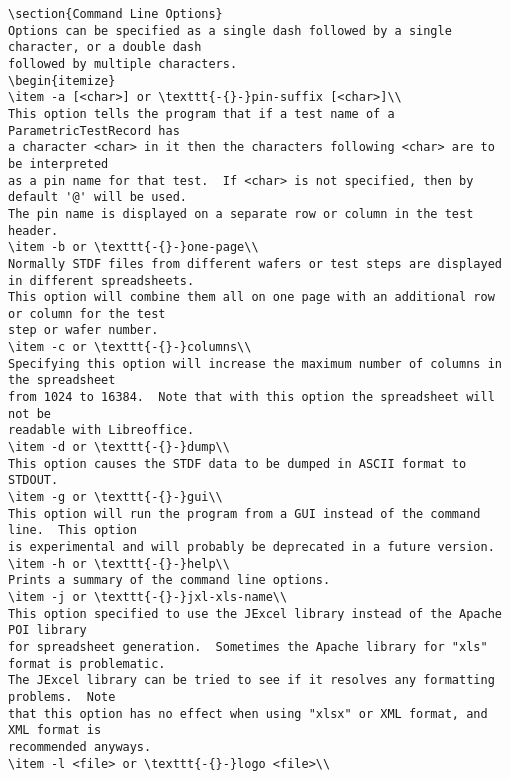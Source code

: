 \documentclass[letterpaper]{article}
\begin{document}
\begin{verbatim}
\section{Command Line Options}
Options can be specified as a single dash followed by a single character, or a double dash
followed by multiple characters.
\begin{itemize}
\item -a [<char>] or \texttt{-{}-}pin-suffix [<char>]\\
This option tells the program that if a test name of a ParametricTestRecord has
a character <char> in it then the characters following <char> are to be interpreted
as a pin name for that test.  If <char> is not specified, then by default '@' will be used.
The pin name is displayed on a separate row or column in the test header.
\item -b or \texttt{-{}-}one-page\\
Normally STDF files from different wafers or test steps are displayed in different spreadsheets.
This option will combine them all on one page with an additional row or column for the test
step or wafer number.
\item -c or \texttt{-{}-}columns\\
Specifying this option will increase the maximum number of columns in the spreadsheet
from 1024 to 16384.  Note that with this option the spreadsheet will not be
readable with Libreoffice.
\item -d or \texttt{-{}-}dump\\
This option causes the STDF data to be dumped in ASCII format to STDOUT.
\item -g or \texttt{-{}-}gui\\
This option will run the program from a GUI instead of the command line.  This option
is experimental and will probably be deprecated in a future version.
\item -h or \texttt{-{}-}help\\
Prints a summary of the command line options.
\item -j or \texttt{-{}-}jxl-xls-name\\
This option specified to use the JExcel library instead of the Apache POI library
for spreadsheet generation.  Sometimes the Apache library for "xls" format is problematic.
The JExcel library can be tried to see if it resolves any formatting problems.  Note
that this option has no effect when using "xlsx" or XML format, and XML format is
recommended anyways.
\item -l <file> or \texttt{-{}-}logo <file>\\

\end{verbatim}
\end{document}
